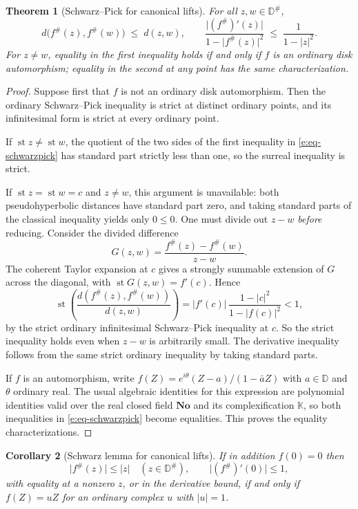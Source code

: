 \documentclass[11pt,a4paper]{article}
\numberwithin{equation}{section}
\newtheorem{theorem}{Theorem}[section]
\newtheorem{corollary}[theorem]{Corollary}
\theoremstyle{definition}
\theoremstyle{remark}
\theoremstyle{plain}
\newcommand{\K}{\mathbb K}
\newcommand{\No}{\mathbf{No}}
\DeclareMathOperator{\st}{st}
\newcommand{\halo}[1]{#1^{\#}}
\newcommand{\ev}[1]{#1^{\#}}
\newcommand{\abs}[1]{\lvert #1\rvert}
\begin{document}
\begin{theorem}[Schwarz--Pick for canonical lifts]\label{e:thm-schwarzpick}
For all $z,w\in\halo{\mathbb D}$,
\begin{equation}\label{e:eq-schwarzpick}
 d\bigl(\ev f(z),\ev f(w)\bigr)\;\le\;d(z,w),
 \qquad
 \frac{\abs{(\ev f)'(z)}}{1-\abs{\ev f(z)}^{2}}
 \;\le\;\frac1{1-\abs z^{2}} .
\end{equation}
For $z\ne w$, equality in the first inequality holds if and only if $f$ is
an ordinary disk automorphism; equality in the second at any point has the
same characterization.
\end{theorem}

\begin{proof}
Suppose first that $f$ is not an ordinary disk automorphism.  Then the
ordinary Schwarz--Pick inequality is strict at distinct ordinary points,
and its infinitesimal form is strict at every ordinary point.

If $\st z\ne\st w$, the quotient of the two sides of the first inequality
in \eqref{e:eq-schwarzpick} has standard part strictly less than one, so
the surreal inequality is strict.

If $\st z=\st w=c$ and $z\ne w$, this argument is unavailable: both
pseudohyperbolic distances have standard part zero, and taking standard
parts of the classical inequality yields only $0\le0$.  One must divide
out $z-w$ \emph{before} reducing.  Consider the divided difference
\[
 G(z,w)=\frac{\ev f(z)-\ev f(w)}{z-w}.
\]
The coherent Taylor expansion at $c$ gives a strongly summable extension
of $G$ across the diagonal, with $\st G(z,w)=f'(c)$.  Hence
\[
 \st\!\left(\frac{d(\ev f(z),\ev f(w))}{d(z,w)}\right)
 =\abs{f'(c)}\,\frac{1-\abs c^{2}}{1-\abs{f(c)}^{2}}<1 ,
\]
by the strict ordinary infinitesimal Schwarz--Pick inequality at $c$.  So
the strict inequality holds even when $z-w$ is arbitrarily small.  The
derivative inequality follows from the same strict ordinary inequality by
taking standard parts.

If $f$ is an automorphism, write $f(Z)=e^{i\theta}(Z-a)/(1-\bar aZ)$ with
$a\in\mathbb D$ and $\theta$ ordinary real.  The usual algebraic
identities for this expression are polynomial identities valid over the
real closed field $\No$ and its complexification $\K$, so both inequalities
in \eqref{e:eq-schwarzpick} become equalities.  This proves the equality
characterizations.
\end{proof}

\begin{corollary}[Schwarz lemma for canonical lifts]\label{e:cor-schwarz}
If in addition $f(0)=0$ then
\[
 \abs{\ev f(z)}\le\abs z\quad(z\in\halo{\mathbb D}),
 \qquad \abs{(\ev f)'(0)}\le1,
\]
with equality at a nonzero $z$, or in the derivative bound, if and only if
$f(Z)=uZ$ for an ordinary complex $u$ with $\abs u=1$.
\end{corollary}
\end{document}
